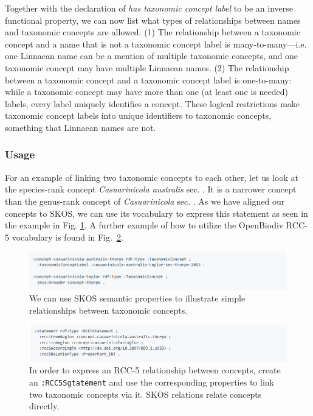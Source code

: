 Together with the declaration of \emph{has taxonomic concept label} to be an inverse functional property, we can now list what types of relationships between names and taxonomic concepts are allowed: (1) The relationship between a taxonomic concept and a name that is not a taxonomic concept label is many-to-many---i.e. one Linnaean name can be a mention of multiple taxonomic concepts, and one taxonomic concept may have multiple Linnaean names. (2) The relationship between a taxonomic concept and a taxonomic concept label is one-to-many: while a taxonomic concept may have more than one (at least one is needed) labels, every label uniquely identifies a concept. These logical restrictions make taxonomic concept labels into unique identifiers to taxonomic concepts, something that Linnaean names are not.

\subsubsection{Usage} For an example of linking two taxonomic concepts to each other, let us look at the species-rank concept \emph{Casuarinicola australis} \cite{taylor_casuarinicola_2010} sec. \cite{thorpe_casuarinicola_2013}. It is a narrower concept than the genus-rank concept of \emph{Casuarinicola} \cite{taylor_casuarinicola_2010} sec. \cite{taylor_casuarinicola_2010}. As we have aligned our concepts to SKOS, we can use its vocabulary to express this statement as seen in the example in Fig. \ref{example-simple-taxonomic-concept-relationships}. A further example of how to utilize the OpenBiodiv RCC-5 vocabulary is found in Fig.~\ref{example-rcc5-taxonomic-concept-relationships}.

\begin{figure}[h!]
\centering
  \includegraphics[width=\textwidth]{Figures/example-simple-taxonomic-concept-relationships}
  \decoRule
  \caption[Example simple taxonomic concept relationships.]
  {We can use SKOS semantic properties to illustrate simple relationships between taxonomic concepts.}
  \label{example-simple-taxonomic-concept-relationships}
\end{figure}

\begin{figure}[h!]
\centering
  \includegraphics[width=\textwidth]{Figures/example-rcc5-taxonomic-concept-relationships}
  \decoRule
  \caption[Example of RCC-5 taxonomic concept relationships.]{In order to express an RCC-5 relationship between concepts, create an {\tt :RCC5Sgtatement} and use the corresponding properties to link two taxonomic concepts via it. SKOS relations relate concepts directly.}
  \label{example-rcc5-taxonomic-concept-relationships}
\end{figure}

